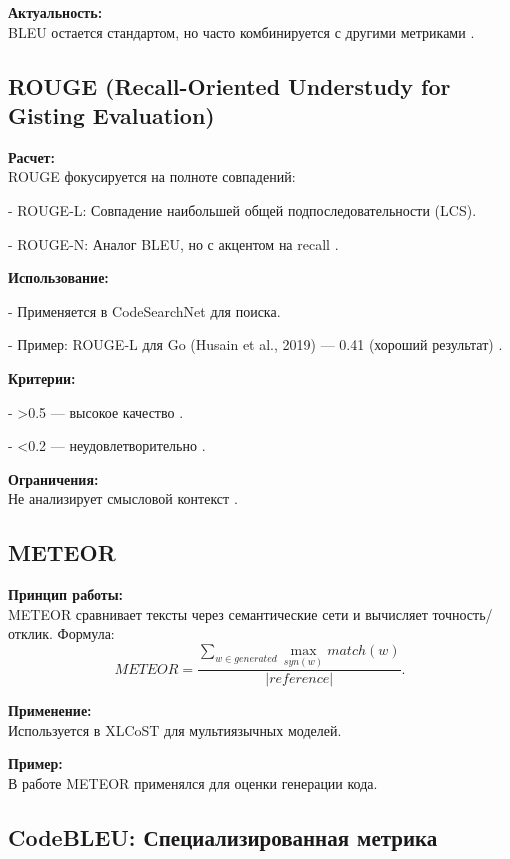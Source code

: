 \documentclass[14pt]{article}
\theoremstyle{definition}
\begin{document}
\textbf{Актуальность:} \\
BLEU остается стандартом, но часто комбинируется с другими метриками \cite{wan2023codet5+}.

\subsection{ROUGE (Recall-Oriented Understudy for Gisting Evaluation)}

\textbf{Расчет:} \\
ROUGE фокусируется на полноте совпадений:

    
- ROUGE-L: Совпадение наибольшей общей подпоследовательности (LCS).
    
- ROUGE-N: Аналог BLEU, но с акцентом на recall \cite{chen2023}.


\textbf{Использование:}

    
- Применяется в CodeSearchNet \cite{husain2019codesearchnet} для поиска.
    
- Пример: ROUGE-L для Go (Husain et al., 2019) — 0.41 (хороший результат) \cite{husain2019codesearchnet}.


\textbf{Критерии:}

    
- >0.5 — высокое качество \cite{zhu2022}.
    
- <0.2 — неудовлетворительно \cite{liu2022survey}.


\textbf{Ограничения:} \\
Не анализирует смысловой контекст \cite{feng2023}.

\subsection{METEOR}

\textbf{Принцип работы:} \\
METEOR сравнивает тексты через семантические сети и вычисляет точность/отклик. Формула:
\[
METEOR = \frac{\sum_{w \in generated} \max_{syn(w)} match(w)}{|reference|}.
\]

\textbf{Применение:} \\
Используется в XLCoST \cite{zhu2022} для мультиязычных моделей.

\textbf{Пример:} \\
В работе \cite{wan2023codet5+} METEOR применялся для оценки генерации кода.

\subsection{CodeBLEU: Специализированная метрика}
\end{document}
